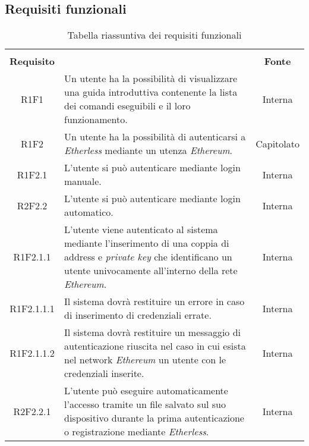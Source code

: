\subsection{Requisiti funzionali}

\renewcommand{\arraystretch}{2.2}

\begin{longtable}{|c|p{8cm}|c|}
	\arrayrulecolor{white}
	
	\caption{Tabella riassuntiva dei requisiti funzionali}\\
	
	\rowcolor{header}
	
	\textbf{Requisito} & \centering{\textbf{Descrizione}} & \textbf{Fonte}\\
	
	\endhead
	
	R1F1 & Un utente ha la possibilità di visualizzare una guida introduttiva contenente la lista dei comandi eseguibili e il loro funzionamento. & Interna \\
	
	R1F2 & Un utente ha la possibilità di autenticarsi a \textit{Etherless} mediante un utenza \textit{Ethereum\glos}. & Capitolato \\
	
	R1F2.1 & L'utente si può autenticare mediante login manuale.  & Interna \\
	
	R2F2.2 & L'utente si può autenticare mediante login automatico. & Interna \\
	
	R1F2.1.1 &  L'utente viene autenticato al sistema mediante l'inserimento di una coppia di address e \textit{private key\glo} che identificano un utente univocamente all'interno della rete \textit{Ethereum\glos}. & Interna \\
	
	R1F2.1.1.1 &  Il sistema dovrà restituire un errore in caso di inserimento di credenziali errate. & Interna \\
	
	R1F2.1.1.2 &  Il sistema dovrà restituire un messaggio di autenticazione riuscita nel caso in cui esista nel network \textit{Ethereum\glo} un utente con le credenziali inserite. & Interna \\
	
	R2F2.2.1 &  L'utente può eseguire automaticamente l'accesso tramite un file salvato sul suo dispositivo durante la prima autenticazione o registrazione mediante \textit{Etherless}.  & Interna \\
	

\end{longtable}
